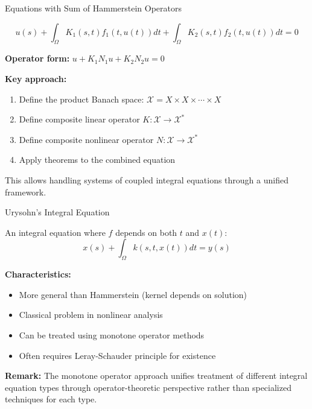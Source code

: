 \documentclass[aspectratio=169,10pt]{beamer}
\newcommand{\X}{\mathcal{X}}
\begin{document}
\begin{frame}{Equations with Sum of Hammerstein Operators}
    \begin{problem}
        \[
            u(s) + \int_{\Omega} K_1(s,t) f_1(t, u(t)) dt + \int_{\Omega} K_2(s,t) f_2(t, u(t)) dt = 0
        \]
    \end{problem}

    \vspace{0.3cm}

    \textbf{Operator form:} $u + K_1 N_1 u + K_2 N_2 u = 0$

    \vspace{0.3cm}

    \textbf{Key approach:}
    \begin{enumerate}
        \item Define the product Banach space: $\X = X \times X \times \cdots \times X$
        \item Define composite linear operator $K: \X \to \X^*$
        \item Define composite nonlinear operator $N: \X \to \X^*$
        \item Apply theorems to the combined equation
    \end{enumerate}

    \vspace{0.3cm}

    This allows handling systems of coupled integral equations through a unified framework.
\end{frame}

\begin{frame}{Urysohn's Integral Equation}
    \begin{definition}
        An integral equation where $f$ depends on both $t$ and $x(t)$:
        \[
            x(s) + \int_{\Omega} k(s, t, x(t)) dt = y(s)
        \]
    \end{definition}

    \vspace{0.3cm}

    \textbf{Characteristics:}
    \begin{itemize}
        \item More general than Hammerstein (kernel depends on solution)
        \item Classical problem in nonlinear analysis
        \item Can be treated using monotone operator methods
        \item Often requires Leray-Schauder principle for existence
    \end{itemize}

    \vspace{0.3cm}

    \textbf{Remark:} The monotone operator approach unifies treatment of different integral equation types through operator-theoretic perspective rather than specialized techniques for each type.
\end{frame}
\end{document}
